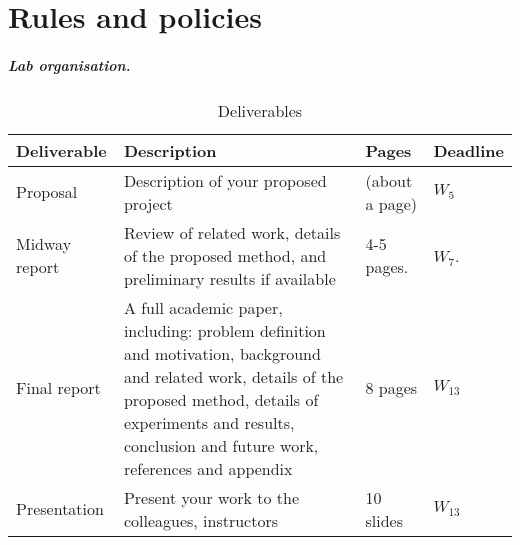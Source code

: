 \chapter{Rules and policies}



\paragraph{Lab organisation.} 

\begin{center}
\begin{table}
\caption{Deliverables}
\begin{tabular}{|l|p{7cm}|l|l|} \hline
Deliverable & Description & Pages & Deadline \\ \hline
Proposal&   Description of your proposed project & (about a page) & $W_5$\\ \hline
Midway report & Review of related work, details of the proposed method, and preliminary results if available &  4-5 pages. & $W_7$.\\ \hline
Final report & A full academic paper, including: problem definition and motivation, background and related work, details of the proposed method, details of experiments and results, conclusion and future work, references and appendix & 8 pages & $W_{13}$\\ \hline
Presentation & Present your work to the colleagues, instructors & 10 slides & $W_{13}$\\ \hline
\end{tabular}
\label{tab:deliverables}
\end{table}
\end{center}

